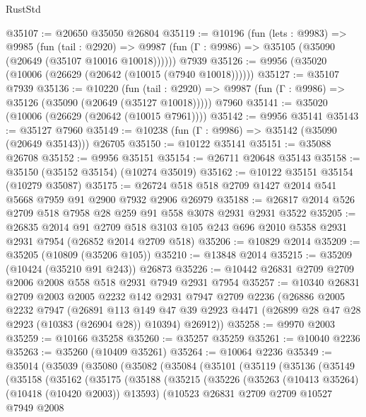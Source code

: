 \begin{lexlean}{RustStd}
\begin{coremodule}
@35107 := @20650 @35050 @26804
@35119 := @10196
    (fun (lets : @9983) =>
    @9985
      (fun (tail : @2920) =>
      @9987 (fun (Γ : @9986) => @35105 (@35090 (@20649 (@35107 @10016 @10018))))))
    @7939
@35126 := @9956 (@35020 (@10006 (@26629 (@20642 (@10015 (@7940 @10018))))))
@35127 := @35107 @7939
@35136 := @10220
    (fun (tail : @2920) => @9987 (fun (Γ : @9986) => @35126 (@35090 (@20649 (@35127 @10018)))))
    @7960
@35141 := @35020 (@10006 (@26629 (@20642 (@10015 @7961))))
@35142 := @9956 @35141
@35143 := @35127 @7960
@35149 := @10238 (fun (Γ : @9986) => @35142 (@35090 (@20649 @35143))) @26705
@35150 := @10122 @35141
@35151 := @35088 @26708
@35152 := @9956 @35151
@35154 := @26711 @20648 @35143
@35158 := @35150 (@35152 @35154) (@10274 @35019)
@35162 := @10122 @35151 @35154 (@10279 @35087)
@35175 := @26724 @518 @518 @2709 @1427 @2014 @541 @5668 @7959 @91 @2900 @7932 @2906 @26979
@35188 := @26817 @2014 @526 @2709 @518 @7958 @28 @259 @91 @558 @3078 @2931 @2931 @3522
@35205 := @26835
    @2014
    @91
    @2709
    @518
    @3103
    @105
    @243
    @696
    @2010
    @5358
    @2931
    @2931
    @7954
    (@26852 @2014 @2709 @518)
@35206 := @10829 @2014
@35209 := @35205 (@10809 (@35206 @105))
@35210 := @13848 @2014
@35215 := @35209 (@10424 (@35210 @91 @243)) @26873
@35226 := @10442 @26831 @2709 @2709 @2006 @2008 @558 @518 @2931 @7949 @2931 @7954
@35257 := @10340
    @26831
    @2709
    @2003
    @2005
    @2232
    @142
    @2931
    @7947
    @2709
    @2236
    (@26886
      @2005
      @2232
      @7947
      (@26891
        @113
        @149
        @47
        @39
        @2923
        @4471
        (@26899 @28 @47 @28 @2923 (@10383 (@26904 @28)) @10394)
        @26912))
@35258 := @9970 @2003
@35259 := @10166 @35258
@35260 := @35257 @35259
@35261 := @10040 @2236
@35263 := @35260 (@10409 @35261)
@35264 := @10064 @2236
@35349 := @35014
    (@35039
      (@35080
        (@35082
          (@35084
            (@35101
              (@35119
                (@35136
                  (@35149
                    (@35158
                      (@35162
                        (@35175
                          (@35188
                            (@35215
                              (@35226
                                (@35263 (@10413 @35264) (@10418 (@10420 @2003)) @13593)
                                (@10523
                                  @26831
                                  @2709
                                  @2709
                                  @10527
                                  @7949
                                  @2008

\end{coremodule}
\end{lexlean}
